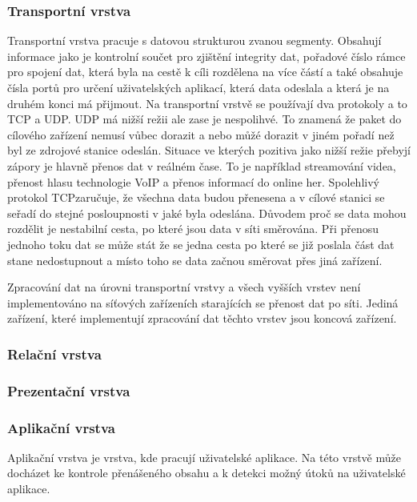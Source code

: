 \subsubsection{Transportní vrstva}
Transportní vrstva pracuje s datovou strukturou zvanou segmenty.
Obsahují informace jako je kontrolní součet pro zjištění integrity dat,
pořadové číslo rámce pro spojení dat, která byla na cestě k cíli rozdělena na více částí a také obsahuje čísla portů
pro určení uživatelských aplikací, která data odeslala a která je na druhém konci má přijmout.
Na transportní vrstvě se používají dva protokoly a to TCP a UDP. UDP má nižší režii ale zase je nespolihvé.
To znamená že paket do cílového zařízení nemusí vůbec dorazit a nebo můžé dorazit v jiném pořadí než byl ze
zdrojové stanice odeslán. Situace ve kterých pozitiva jako nižší režie přebyjí zápory je hlavně přenos dat v
reálném čase. To je například streamování videa, přenost hlasu technologie VoIP a přenos informací do online her.
Spolehlivý protokol TCPzaručuje, že všechna data budou přenesena a v cílové stanici se seřadí do
stejné posloupnosti v jaké byla odeslána. Důvodem proč se data mohou rozdělit je nestabilní cesta,
po které jsou data v síti směrována. Při přenosu jednoho toku dat se může stát že se jedna cesta po které se
již poslala část dat stane nedostupnout a místo toho se data začnou směrovat přes jiná zařízení.

Zpracování dat na úrovni transportní vrstvy a všech vyšších vrstev není implementováno na síťových
zařízeních starajících se přenost dat po síti. Jediná zařízení, které implementují zpracování
dat těchto vrstev jsou koncová zařízení.

\subsubsection{Relační vrstva}


\subsubsection{Prezentační vrstva}


\subsubsection{Aplikační vrstva}
Aplikační vrstva je vrstva, kde pracují uživatelské aplikace.
Na této vrstvě může docházet ke kontrole přenášeného obsahu a k detekci možný útoků na uživatelské aplikace.




